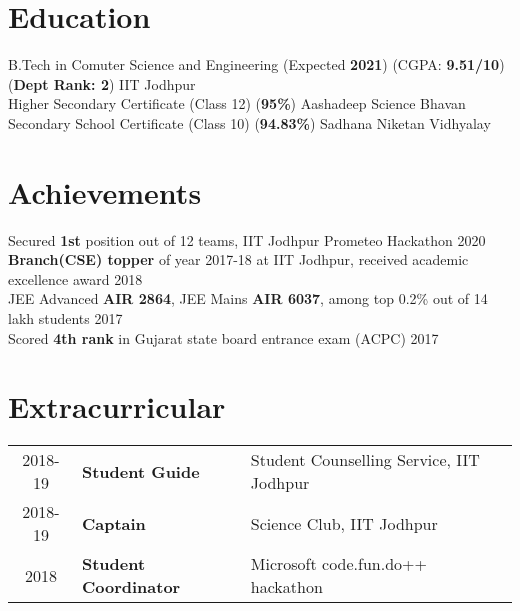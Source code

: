 \documentclass[a4paper]{single-column}
\begin{document}
\vspace{\topsep}
\begin{infos}
\end{infos}

\vspace{\topsep}
\begin{infos}
\end{infos}

\vspace{\topsep}
\begin{infos}
\end{infos}

\section{Education}
  B.Tech in Comuter Science and Engineering (Expected \textbf{2021}) (CGPA: \textbf{9.51/10}) (\textbf{Dept Rank: 2})
  \hfill IIT Jodhpur \\
  Higher Secondary Certificate (Class 12) (\textbf{95\%})
  \hfill Aashadeep Science Bhavan \\
  Secondary School Certificate (Class 10) (\textbf{94.83\%})
  \hfill Sadhana Niketan Vidhyalay \\

\sectionsep
\section{Achievements}
{Secured \textbf{1st} position out of 12 teams, IIT Jodhpur Prometeo Hackathon \hfill 2020}\\
{\textbf{Branch(CSE) topper} of year 2017-18 at IIT Jodhpur, received academic excellence award \hfill 2018}\\
{JEE Advanced \textbf{AIR 2864}, JEE Mains \textbf{AIR 6037}, among top 0.2\% out of 14 lakh students \hfill 2017}\\
{Scored \textbf{4th rank} in Gujarat state board entrance exam (ACPC) \hfill 2017}

\sectionsep
\section{Extracurricular}
\begin{tabular}{ c l l }
2018-19 & \textbf{Student Guide} & Student Counselling Service, IIT Jodhpur \\
2018-19 & \textbf{Captain} & Science Club, IIT Jodhpur \\
2018  & \textbf{Student Coordinator} & Microsoft code.fun.do++ hackathon\\ 
\end{tabular}
\end{document}
